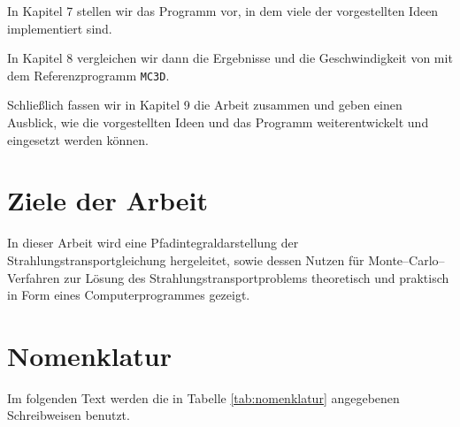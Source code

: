	In Kapitel 7 stellen wir das Programm \pirate vor, in dem viele der vorgestellten Ideen implementiert sind.
	
	In Kapitel 8 vergleichen wir dann die Ergebnisse und die Geschwindigkeit von \pirate mit dem Referenzprogramm \texttt{MC3D}.
	
	Schließlich fassen wir in Kapitel 9 die Arbeit zusammen und geben einen Ausblick, wie die vorgestellten Ideen und das Programm \pirate weiterentwickelt und eingesetzt werden können.

	\section{Ziele der Arbeit}
	In dieser Arbeit wird eine Pfadintegraldarstellung der Strahlungstransportgleichung hergeleitet, sowie dessen Nutzen für Monte--Carlo--Verfahren zur Lösung des Strahlungstransportproblems theoretisch und praktisch in Form eines Computerprogrammes gezeigt.
	
	\section{Nomenklatur}\label{subsec:nomenklatur}
	Im folgenden Text werden die in Tabelle \ref{tab:nomenklatur} angegebenen Schreibweisen benutzt.

